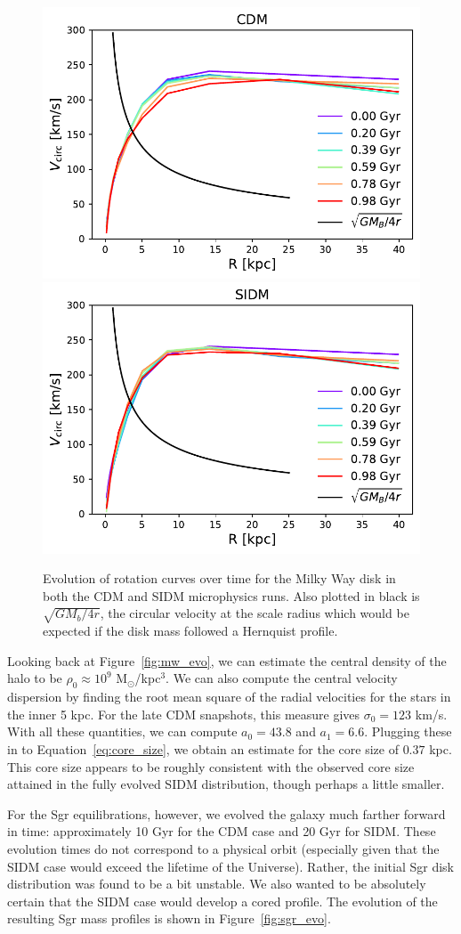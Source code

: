 \begin{figure}
    \centering 
    \includegraphics[width=0.45\linewidth]{figs/mw_cdm_rot_curve.pdf}
    \includegraphics[width=0.45\linewidth]{figs/mw_sidm_rot_curve.pdf}
    \caption{%
        Evolution of rotation curves over time for the Milky Way disk in both
        the CDM and SIDM microphysics runs. Also plotted in black is
        $\sqrt{GM_b/4r}$, the circular velocity at the scale radius which would
        be expected if the disk mass followed a Hernquist profile.
    }
    \label{fig:mw_rot_curves}
\end{figure}

Looking back at Figure~\ref{fig:mw_evo}, we can estimate the central density
of the halo to be $\rho_0 \approx 10^9$ M$_\odot$/kpc$^3$. We can also compute
the central velocity dispersion by finding the root mean square of the radial
velocities for the stars in the inner 5 kpc. For the late CDM snapshots, this
measure gives $\sigma_0 = 123$ km/s.  With all these quantities, we can
compute $a_0 = 43.8$ and $a_1 = 6.6$. Plugging these in to
Equation~\ref{eq:core_size}, we obtain an estimate for the core size of $0.37$
kpc. This core size appears to be roughly consistent with the observed core
size attained in the fully evolved SIDM distribution, though perhaps a little
smaller.

For the Sgr equilibrations, however, we evolved the galaxy much farther
forward in time: approximately 10 Gyr for the CDM case and 20 Gyr for SIDM.
These evolution times do not correspond to a physical orbit (especially given
that the SIDM case would exceed the lifetime of the Universe).  Rather, the
initial Sgr disk distribution was found to be a bit unstable.  We also wanted
to be absolutely certain that the SIDM case would develop a cored profile.
The evolution of the resulting Sgr mass profiles is shown in
Figure~\ref{fig:sgr_evo}.


